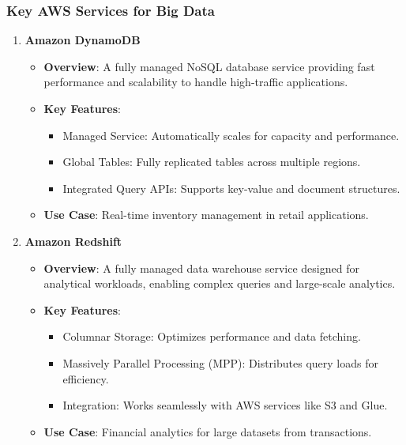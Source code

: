 \documentclass[aspectratio=169]{beamer}
\begin{document}
\begin{frame}
    \frametitle{Key AWS Services for Big Data}
    \begin{enumerate}
        \item \textbf{Amazon DynamoDB}
        \begin{itemize}
            \item \textbf{Overview}: A fully managed NoSQL database service providing fast performance and scalability to handle high-traffic applications.
            \item \textbf{Key Features}:
            \begin{itemize}
                \item Managed Service: Automatically scales for capacity and performance.
                \item Global Tables: Fully replicated tables across multiple regions.
                \item Integrated Query APIs: Supports key-value and document structures.
            \end{itemize}
            \item \textbf{Use Case}: Real-time inventory management in retail applications.
        \end{itemize}

        \item \textbf{Amazon Redshift}
        \begin{itemize}
            \item \textbf{Overview}: A fully managed data warehouse service designed for analytical workloads, enabling complex queries and large-scale analytics.
            \item \textbf{Key Features}:
            \begin{itemize}
                \item Columnar Storage: Optimizes performance and data fetching.
                \item Massively Parallel Processing (MPP): Distributes query loads for efficiency.
                \item Integration: Works seamlessly with AWS services like S3 and Glue.
            \end{itemize}
            \item \textbf{Use Case}: Financial analytics for large datasets from transactions.
        \end{itemize}
    \end{enumerate}
\end{frame}
\end{document}
